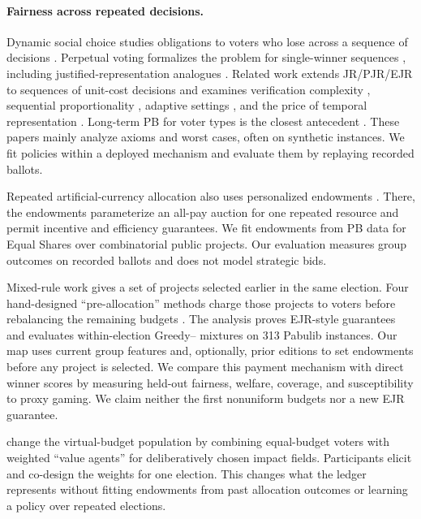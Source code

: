 \paragraph{Fairness across repeated decisions.}
Dynamic social choice studies obligations to voters who lose across a sequence
of decisions \citep{parkes2013dynamic,freeman2017dynamic}. Perpetual voting
formalizes the problem for single-winner sequences
\citep{lackner2020perpetual}, including justified-representation analogues
\citep{bulteau2021perpetual}. Related work extends JR/PJR/EJR to sequences of
unit-cost decisions \citep{elkind2023temporal,elkind2024temporalelections} and
examines verification complexity \citep{elkind2025verifying}, sequential
proportionality \citep{skowron2022public,chandak2026sequential}, adaptive
settings \citep{kraiczy2023adaptive}, and the price of temporal representation
\citep{teh2026price}. Long-term PB for voter types is the closest antecedent
\citep{lackner2021longterm}. These papers mainly analyze axioms and worst
cases, often on synthetic instances. We fit policies within a deployed
mechanism and evaluate them by replaying recorded ballots.

Repeated artificial-currency allocation also uses personalized endowments
\citep{gorokh2016artificial}. There, the endowments parameterize an all-pay
auction for one repeated resource and permit incentive and efficiency
guarantees. We fit endowments from PB data for Equal Shares over combinatorial
public projects. Our evaluation measures group outcomes on recorded ballots
and does not model strategic bids.

Mixed-rule work gives \MES{} a set of projects selected earlier in the same
election. Four hand-designed ``pre-allocation'' methods charge those projects
to voters before rebalancing the remaining budgets \citep{baychkov2026mixed}.
The analysis proves EJR-style guarantees and evaluates within-election
Greedy--\MES{} mixtures on 313 Pabulib instances. Our map uses current group
features and, optionally, prior editions to set endowments before any project
is selected. We compare this payment mechanism with direct winner scores by
measuring held-out fairness, welfare, coverage, and susceptibility to proxy
gaming. We claim neither the first nonuniform \MES{} budgets nor a new EJR
guarantee.

\citet{yang2025komitee} change the virtual-budget population by combining
equal-budget voters with weighted ``value agents'' for deliberatively chosen
impact fields. Participants elicit and co-design the weights for one election.
This changes what the \MES{} ledger represents without fitting endowments from
past allocation outcomes or learning a policy over repeated elections.

